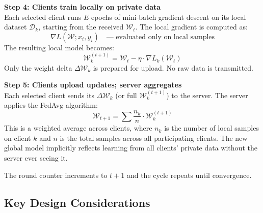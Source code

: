 \documentclass[12pt]{article}
\newcommand{\W}{\mathcal{W}}
\newcommand{\Dk}{\mathcal{D}_k}
\begin{document}
\textbf{Step 4: Clients train locally on private data} \\
Each selected client runs $E$ epochs of mini-batch gradient descent on its local dataset $\Dk$, starting from the received $\W_t$. The local gradient is computed as:
\[
\nabla L(\W; x_i, y_i) \quad \text{--- evaluated only on local samples}
\]
The resulting local model becomes:
\[
\W_k^{(t+1)} = \W_t - \eta \cdot \nabla L_k(\W_t)
\]
Only the weight delta $\Delta \W_k$ is prepared for upload. No raw data is transmitted.

\textbf{Step 5: Clients upload updates; server aggregates} \\
Each selected client sends its $\Delta \W_k$ (or full $\W_k^{(t+1)}$) to the server. The server applies the FedAvg algorithm:
\[
\W_{t+1} = \sum \frac{n_k}{n} \cdot \W_k^{(t+1)}
\]
This is a weighted average across clients, where $n_k$ is the number of local samples on client $k$ and $n$ is the total samples across all participating clients. The new global model implicitly reflects learning from all clients' private data without the server ever seeing it.

The round counter increments to $t+1$ and the cycle repeats until convergence.

\subsection{Key Design Considerations}
\end{document}
